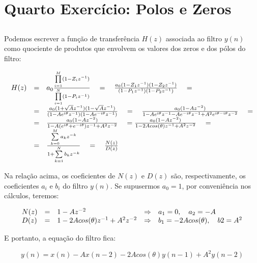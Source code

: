 \section{Quarto Exercício: Polos e Zeros}

\subsection{}

Podemos escrever a função de transferência $H(z)$ associada ao filtro $y(n)$ como quociente de produtos que envolvem os valores dos zeros e dos pólos do filtro:

\[\displaystyle
\begin{array}{l c l}
  H(z) & = & a_0 \frac{\prod\limits_{i=1}^M(1-Z_i z^{-1})}{\prod\limits_{i=1}^N (1-P_i z^{-1})} \quad = \quad \frac{a_0 (1 - Z_1 z^{-1})(1 - Z_2 z^{-1} )}{(1 - P_1 z^{-1})(1 - P_2 z^{-1})} \quad = \\
       & = & \frac{a_0 (1+\sqrt{A}z^{-1})(1-\sqrt{A}z^{-1})}{(1-Ae^{i\theta}z^{-1})(1-Ae^{-i\theta}z^{-1})} \quad = \quad \frac{a_0 (1-Az^{-2})}{1-Ae^{i\theta}z^{-1} - Ae^{-i\theta}z^{-1} + A^2 e^{i\theta-i\theta}z^{-2}} \quad = \\
       & = & \frac{a_0 (1-Az^{-2})}{1-A(e^{i\theta}+e^{-i\theta})z^{-1}+A^2 z^{-2}} \quad = \frac{a_0 (1-Az^{-2})}{1-2Acos(\theta)z^{-1}+A^2 z^{-2}} \quad = \\
       & = & \frac{ \sum\limits_{k=0}^M a_k z^{-k}}{ 1 + \sum\limits_{k=1}^N b_k z^{-k} } \quad = \quad \frac{N(z)}{D(z)}
\end{array}
\]

Na relação acima, os coeficientes de $N(z)$ e $D(z)$ são, respectivamente, os coeficientes $a_i$ e $b_i$ do filtro $y(n)$. Se supusermos $a_0=1$, por conveniência nos cálculos, teremos:

\[\displaystyle
\begin{array}{l c l c l}
  N(z) & = & 1-Az^{-2} & \Rightarrow & a_1 = 0, \quad a_2 = -A \\
  D(z) & = & 1-2Acos(\theta)z^{-1}+A^2 z^{-2} & \Rightarrow & b_1 = -2Acos(\theta), \quad b2 = A^2
\end{array}
\]

E portanto, a equação do filtro fica:

\begin{equation}\displaystyle
  y(n) = x(n) - Ax(n-2) -2Acos(\theta)y(n-1) + A^2y(n-2)
\end{equation}


